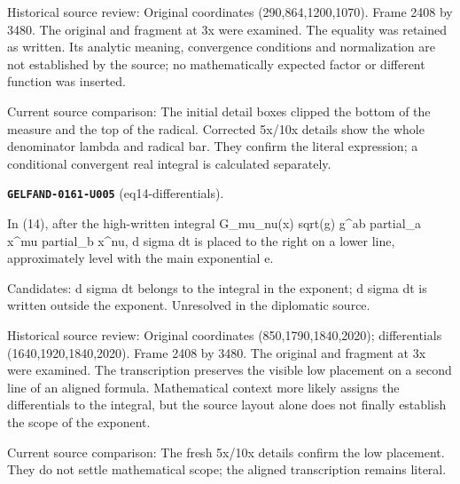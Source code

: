 Historical source review: Original coordinates (290,864,1200,1070). Frame 2408 by 3480. The original and fragment at 3x were examined. The equality was retained as written. Its analytic meaning, convergence conditions and normalization are not established by the source; no mathematically expected factor or different function was inserted.\par
Current source comparison: The initial detail boxes clipped the bottom of the measure and the top of the radical. Corrected 5x/10x details show the whole denominator lambda and radical bar. They confirm the literal expression; a conditional convergent real integral is calculated separately.\par\medskip
\par\noindent\leavevmode{}\label{GELFAND-0161-U005}\label{GELFAND-P001485:eq14-differentials}\textbf{\texttt{GELFAND-0161-U005}} (eq14-differentials).\nopagebreak[4]\par
In (14), after the high-written integral G\_mu\_nu(x) sqrt(g) g\textasciicircum{}ab partial\_a x\textasciicircum{}mu partial\_b x\textasciicircum{}nu, d sigma dt is placed to the right on a lower line, approximately level with the main exponential e.\par
Candidates: d sigma dt belongs to the integral in the exponent; d sigma dt is written outside the exponent. Unresolved in the diplomatic source.\par
Historical source review: Original coordinates (850,1790,1840,2020); differentials (1640,1920,1840,2020). Frame 2408 by 3480. The original and fragment at 3x were examined. The transcription preserves the visible low placement on a second line of an aligned formula. Mathematical context more likely assigns the differentials to the integral, but the source layout alone does not finally establish the scope of the exponent.\par
Current source comparison: The fresh 5x/10x details confirm the low placement. They do not settle mathematical scope; the aligned transcription remains literal.\par\medskip
